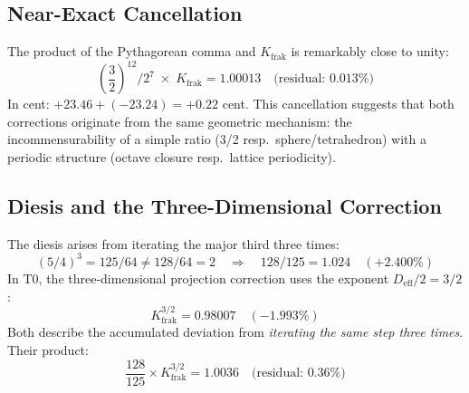 \subsection{Near-Exact Cancellation}

The product of the Pythagorean comma and $K_\text{frak}$ is remarkably close to unity:
\begin{equation}
	\left(\frac{3}{2}\right)^{12} \Big/ 2^7 \;\times\; K_\text{frak} = 1.00013 \quad \text{(residual: } 0.013\%\text{)}
\end{equation}
In cent: $+23.46 + (-23.24) = +0.22$ cent. This cancellation suggests that both corrections originate from the same geometric mechanism: the incommensurability of a simple ratio (3/2 resp.\ sphere/tetrahedron) with a periodic structure (octave closure resp.\ lattice periodicity).

\begin{table}[h]
\centering
{}
\caption{Musical commas and T0 corrections compared.}
\label{tab:commas}
\end{table}

\subsection{Diesis and the Three-Dimensional Correction}

The diesis arises from iterating the major third three times:
\begin{equation}
	(5/4)^3 = 125/64 \neq 128/64 = 2 \quad \Rightarrow \quad 128/125 = 1.024 \quad (+2.400\%)
\end{equation}
In T0, the three-dimensional projection correction uses the exponent $D_\text{eff}/2 = 3/2$:
\begin{equation}
	K_\text{frak}^{3/2} = 0.98007 \quad (-1.993\%)
\end{equation}
Both describe the accumulated deviation from \emph{iterating the same step three times}. Their product:
\begin{equation}
	\frac{128}{125} \times K_\text{frak}^{3/2} = 1.0036 \quad \text{(residual: } 0.36\%\text{)}
\end{equation}

